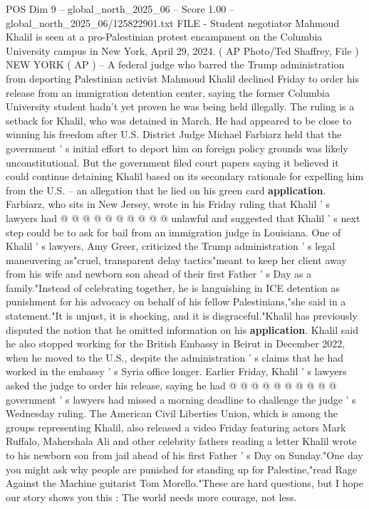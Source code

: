 \begin{textsample}{POS Dim 9 – global\_north\_2025\_06 – Score 1.00 – global\_north\_2025\_06/125822901.txt}  \label{ex:f9_pos_350}
FILE - Student negotiator Mahmoud Khalil is seen at a pro-Palestinian protest encampment on the Columbia University campus in New York, April 29, 2024. ( AP Photo/Ted Shaffrey, File ) NEW YORK ( AP ) -- A federal judge who barred the Trump administration from deporting Palestinian activist Mahmoud Khalil declined Friday to order his release from an immigration detention center, saying the former Columbia University student hadn't yet proven he was being held illegally.
The ruling is a setback for Khalil, who was detained in March.
He had appeared to be close to winning his freedom after U.S.
District Judge Michael Farbiarz held that the government ' s initial effort to deport him on foreign policy grounds was likely unconstitutional.
But the government filed court papers saying it believed it could continue detaining Khalil based on its secondary rationale for expelling him from the U.S. -- an allegation that he lied on his green card \textbf{application}.
Farbiarz, who sits in New Jersey, wrote in his Friday ruling that Khalil ' s lawyers had @ @ @ @ @ @ @ @ @ @ unlawful and suggested that Khalil ' s next step could be to ask for bail from an immigration judge in Louisiana.
One of Khalil ' s lawyers, Amy Greer, criticized the Trump administration ' s legal maneuvering as"cruel, transparent delay tactics"meant to keep her client away from his wife and newborn son ahead of their first Father ' s Day as a family."Instead of celebrating together, he is languishing in ICE detention as punishment for his advocacy on behalf of his fellow Palestinians,"she said in a statement."It is unjust, it is shocking, and it is disgraceful."Khalil has previously disputed the notion that he omitted information on his \textbf{application}.
Khalil said he also stopped working for the British Embassy in Beirut in December 2022, when he moved to the U.S., despite the administration ' s claims that he had worked in the embassy ' s Syria office longer.
Earlier Friday, Khalil ' s lawyers asked the judge to order his release, saying he had @ @ @ @ @ @ @ @ @ @ government ' s lawyers had missed a morning deadline to challenge the judge ' s Wednesday ruling.
The American Civil Liberties Union, which is among the groups representing Khalil, also released a video Friday featuring actors Mark Ruffalo, Mahershala Ali and other celebrity fathers reading a letter Khalil wrote to his newborn son from jail ahead of his first Father ' s Day on Sunday."One day you might ask why people are punished for standing up for Palestine,"read Rage Against the Machine guitarist Tom Morello."These are hard questions, but I hope our story shows you this : The world needs more courage, not less.

\end{textsample}
